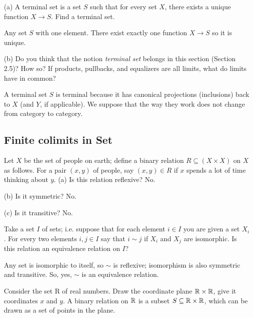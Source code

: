 \documentclass{article}
\begin{document}
(a) A terminal set is a set $S$ such that for every set $X$, there exists a
unique function $X \to S$. Find a terminal set.

\ans

Any set $S$ with one element. There exist exactly one function $X \to S$ so it
is unique.

\vsp

(b) Do you think that the notion \textit{terminal set} belongs in this section (Section
2.5)? How so?  If products, pullbacks, and equalizers are all limits, what do
limits have in common?

\ans

A terminal set $S$ is terminal because it has canonical projections
(inclusions) back to $X$ (and $Y$, if applicable). We suppose that the way they
work does not change from category to category.


\subsection{Finite colimits in Set}


Let $X$ be the set of people on earth; define a binary relation $R \subseteq (X
\times X)$ on $X$ as follows. For a pair $(x, y)$ of people, say $(x, y) \in R$
if $x$ spends a lot of time thinking about $y$.
\ans
(a) Is this relation reflexive? No.

(b) Is it symmetric? No.

(c) Is it transitive? No.


Take a set $I$ of sets; i.e. suppose that for each element $i \in I$ you are
given a set $X_i$. For every two elements $i,j \in I$ say that $i \sim j$ if
$X_i$ and $X_j$ are isomorphic. Is this relation an equivalence relation on
$I$?

\ans

Any set is isomorphic to itself, so $\sim$ is reflexive; isomorphism is also
symmetric and transitive. So, yes, $\sim$ is an equivalence relation.


Consider the set R of real numbers. Draw the coordinate plane $\mathbb{R}
\times \mathbb{R}$, give it coordinates $x$ and $y$. A binary relation on
$\mathbb{R}$ is a subset $S \subseteq \mathbb{R} \times \mathbb{R}$, which can
be drawn as a set of points in the plane.

\vsp
\end{document}
